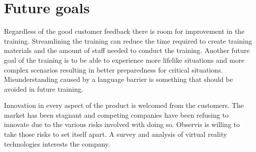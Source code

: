 \documentclass[12pt, a4paper,oneside, nocenter]{thesis}
\begin{document}
\section{Future goals}
Regardless of the good customer feedback there is room for improvement in the training. Streamlining the training can reduce the time required to create training materials and the amount of staff needed to conduct the training. Another future goal of the training is to be able to experience more lifelike situations and more complex scenarios resulting in better preparedness for critical situations. Misunderstanding caused by a language barrier is something that should be avoided in future training.
\par
Innovation in every aspect of the product is welcomed from the customers. The market has been stagnant and competing companies have been refusing to innovate due to the various risks involved with doing so. Observis is willing to take those risks to set itself apart. A survey and analysis of virtual reality technologies interests the company.
\par
\end{document}
